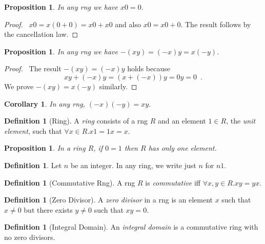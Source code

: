 \documentclass{article}
\let\qed\relax
\newtheorem{proposition}[axiom]{Proposition}
\newtheorem{corollary}{Corollary}[axiom]
\theoremstyle{definition}
\newtheorem{definition}[axiom]{Definition}
\begin{document}
    \begin{proposition}
        In any rng we have $x0 = 0$.
    \end{proposition}

    \begin{proof}
        \pf\ $x0 = x(0+0) = x0+x0$ and also $x0 = x0+0$.
        The result follows by the cancellation law. \qed
    \end{proof}

    \begin{proposition}
        In any rng we have $-(xy) = (-x)y = x(-y)$.
    \end{proposition}

    \begin{proof}
        \pf\ The result $-(xy) = (-x)y$ holds because
        \[ xy + (-x)y = (x+(-x))y = 0y = 0 \enspace . \]
        We prove $-(xy) = x(-y)$ similarly. \qed
    \end{proof}

    \begin{corollary}
        In any rng, $(-x)(-y) = xy$.
    \end{corollary}

    \begin{definition}[Ring]
        A \emph{ring} consists of a rng $R$ and an element $1 \in R$, the \emph{unit element},
        such that $\forall x \in R. x1 = 1x = x$.
    \end{definition}

    \begin{proposition}
        In a ring $R$, if $0 = 1$ then $R$ has only one element.
    \end{proposition}

    \begin{definition}
        Let $n$ be an integer. In any ring, we write just $n$ for $n1$.
    \end{definition}

    \begin{definition}[Commutative Rng]
        A rng $R$ is \emph{commutative} iff $\forall x,y \in R. xy = yx$.
    \end{definition}

    \begin{definition}[Zero Divisor]
        A \emph{zero divisor} in a rng is an element $x$ such that $x \neq 0$ but there exists $y \neq 0$ such
        that $xy = 0$.
    \end{definition}

    \begin{definition}[Integral Domain]
        An \emph{integral domain} is a commutative ring with no zero divisors.
    \end{definition}
\end{document}
